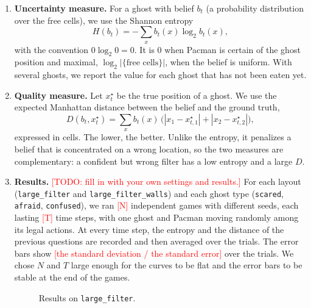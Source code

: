 \documentclass{article}
\begin{document}
\begin{enumerate}[label=\alph*.,leftmargin=*]
    \item \textbf{Uncertainty measure.}
    For a ghost with belief $b_t$ (a probability distribution over the free
    cells), we use the Shannon entropy
    \begin{equation*}
        H(b_t) = -\sum_{x} b_t(x)\log_2 b_t(x),
    \end{equation*}
    with the convention $0\log_2 0=0$. It is $0$ when Pacman is certain of the
    ghost position and maximal, $\log_2 |\{\text{free cells}\}|$, when the
    belief is uniform. With several ghosts, we report the value for each ghost
    that has not been eaten yet.

    \item \textbf{Quality measure.}
    Let $x^\star_t$ be the true position of a ghost. We use the expected
    Manhattan distance between the belief and the ground truth,
    \begin{equation*}
        D(b_t, x^\star_t) = \sum_{x} b_t(x)\,
            \big(|x_1-x^\star_{t,1}|+|x_2-x^\star_{t,2}|\big),
    \end{equation*}
    expressed in cells. The lower, the better. Unlike the entropy, it
    penalizes a belief that is concentrated on a wrong location, so the two
    measures are complementary: a confident but wrong filter has a low entropy
    and a large $D$.

    \item \textbf{Results.}
    \textcolor{red}{[TODO: fill in with your own settings and results.]}
    For each layout (\texttt{large\_filter} and \texttt{large\_filter\_walls})
    and each ghost type (\texttt{scared}, \texttt{afraid},
    \texttt{confused}), we ran \textcolor{red}{[N]} independent games with
    different seeds, each lasting \textcolor{red}{[T]} time steps, with one
    ghost and Pacman moving randomly among its legal actions. At every time
    step, the entropy and the distance of the previous questions are recorded
    and then averaged over the trials. The error bars show
    \textcolor{red}{[the standard deviation / the standard error]} over the
    trials. We chose $N$ and $T$ large enough for the curves to be flat and
    the error bars to be stable at the end of the games.

    \begin{figure}[h]
        \centering
        \caption{Results on \texttt{large\_filter}.}
    \end{figure}


\end{enumerate}
\end{document}
